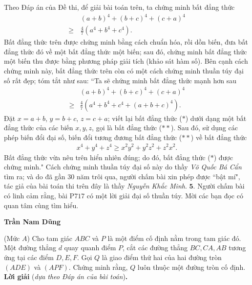 \begin{multicols}{2}
	\vskip 0.05cm
	Theo Đáp án của Đề thi, để giải bài toán trên, ta chứng minh bất đẳng thức
	\begin{align*}
		&{\left( {a + b} \right)^4} + {\left( {b + c} \right)^4} + {\left( {c + a} \right)^4} \\
		\ge\,& \frac{4}{7}\left( {{a^4} + {b^4} + {c^4}} \right).
	\end{align*}
	 Bất đẳng thức trên được chứng minh bằng cách chuẩn hóa, rồi dồn biến, đưa bất đẳng thức đó về một bất đẳng thức một biến; sau đó, chứng minh bất đẳng thức một biến thu được bằng phương pháp giải tích (khảo sát hàm số). Bên cạnh cách chứng minh này, bất đẳng thức trên còn có một cách chứng minh thuần túy đại số rất đẹp; tóm tắt như sau:
	\vskip 0.05cm
	``Ta sẽ chứng minh bất đẳng thức mạnh hơn sau
	\begin{align*}
		&{\left( {a + b} \right)^4} + {\left( {b + c} \right)^4} + {\left( {c + a} \right)^4} \\
		\ge &\frac{4}{7}\left( {{a^4} + {b^4} + {c^4} + {{\left( {a + b + c} \right)}^4}} \right). \tag{$*$}
	\end{align*}
	Đặt $x = a + b$, $y = b + c$, $z = c + a$; viết lại bất đẳng thức ($*$) dưới dạng một bất đẳng thức của các biến $x, y, z$, gọi là bất đẳng thức ($**$). Sau đó, sử dụng các phép biến đổi đại số, biến đổi tương đương bất đẳng thức ($**$) về bất đẳng thức
	\begin{align*}
		{x^4} + {y^4} + {z^4} \ge {x^2}{y^2} + {y^2}{z^2} + {z^2}{x^2}.
	\end{align*}
	Bất đẳng thức vừa nêu trên hiển nhiên đúng; do đó, bất đẳng thức ($*$) được chứng minh."
	\vskip 0.05cm
	Cách chứng minh thuần túy đại số này do thầy \textit{Võ Quốc Bá Cẩn} tìm ra; và do đã gần $30$ năm trôi qua, người chấm bài xin phép được ``bật mí", tác giả của bài toán thi trên đây là thầy \textit{Nguyễn Khắc Minh}.
	\vskip 0.05cm
	$\pmb{5.}$ Người chấm bài có linh cảm rằng, bài P$717$ có một lời giải đại số thuần túy. Mời các bạn đọc có quan tâm cùng tìm hiểu.
	\begin{flushright}
		\textbf{\color{thachthuctoanhoc}Trần Nam Dũng}
	\end{flushright}
	{}
	(Mức $A$) Cho tam giác $ABC$ và $P$ là một điểm cố định nằm trong tam giác đó. Một đường thẳng $d$ quay quanh điểm $P$, cắt các đường thẳng $BC,CA,AB$ tương ứng tại các điểm $D,E,F$. Gọi $Q$ là giao điểm thứ hai của hai đường tròn $(ADE)$ và $(APF)$. Chứng minh rằng, $Q$ luôn thuộc một đường tròn cố định.  
	\vskip 0.05cm
	\textbf{\color{thachthuctoanhoc}Lời giải} (\textit{dựa theo Đáp án của bài toán})\textbf{\color{thachthuctoanhoc}.}

\end{multicols}
